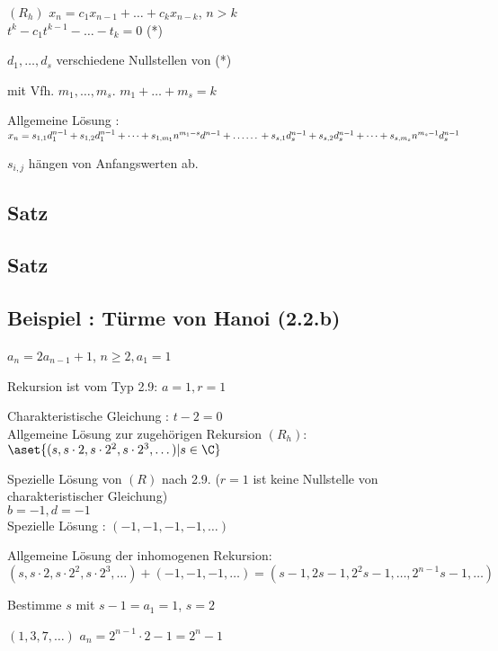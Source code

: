 
$(R_h)$ $x_n = c_1x_{n-1} + \dots + c_k x_{n-k}$, $n > k$
\\ $ t^k -c_1t^{k-1} - \dots - t_k = 0 $ (*)

$d_1, \dots, d_s$ verschiedene Nullstellen von (*)

mit Vfh. $m_1, \dots, m_s$. $m_1 + \dots + m_s = k$

Allgemeine Lösung : 
\\$x_n = s_{1, 1}d_1^{n-1} + s_{1, 2}d_1^{n-1} + \dots + s_{1, m_1}n^{m_1-s}d^{n-1}
\\ + \dots \dots
\\ + s_{s,1}d_s^{n-1} + s_{s, 2}d_s^{n-1} + \dots + s_{s, m_s}n^{m_s-1}d_s^{n-1}
$

$s_{i, j}$ hängen von Anfangswerten ab.

\subsection{Satz} %
\subsection{Satz} %

\subsection{Beispiel : Türme von Hanoi (2.2.b)} %

$a_n = 2a_{n-1} + 1$, $n \geq 2, a_1 = 1$

Rekursion ist vom Typ 2.9: %
$a = 1, r = 1$

Charakteristische Gleichung : $t-2 = 0$
\\Allgemeine Lösung zur zugehörigen Rekursion $(R_h)$:
$\aset{(s, s\cdot 2, s\cdot2^2, s \cdot2^3, \dots) | s \in \C}$

Spezielle Lösung von $(R)$ nach 2.9. %
($r=1$ ist keine Nullstelle von charakteristischer Gleichung)
\\ $b = -1, d = -1$
\\ Spezielle Lösung : $(-1, -1, -1, -1, \dots)$

Allgemeine Lösung der inhomogenen Rekursion: 
\\$(s, s\cdot 2, s\cdot2^2, s\cdot2^3, \dots) + (-1, -1, -1, \dots)
= (s-1, 2s-1, 2^2s-1, \dots, 2^{n-1}s-1, \dots)$

Bestimme $s$ mit $s-1 = a_1 = 1$, $s=2$

$(1, 3, 7, \dots)$ \qquad
$a_n = 2^{n-1}\cdot2-1=2^n-1$






















